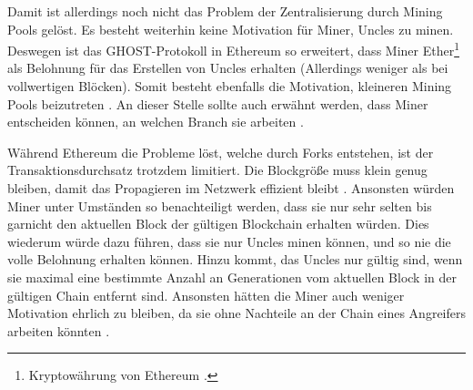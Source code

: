 Damit ist allerdings noch nicht das Problem der Zentralisierung durch Mining Pools gelöst. Es besteht weiterhin keine Motivation für Miner, Uncles zu minen. Deswegen ist das GHOST-Protokoll in Ethereum so erweitert, dass Miner Ether\footnote{Kryptowährung von Ethereum \cite{EthereumTeamEthereumWhitePaper2017}.} als Belohnung für das Erstellen von Uncles erhalten (Allerdings weniger als bei vollwertigen Blöcken). Somit besteht ebenfalls die Motivation, kleineren Mining Pools beizutreten \cite{EthereumTeamEthereumWhitePaper2017}. An dieser Stelle sollte auch erwähnt werden, dass Miner entscheiden können, an welchen Branch sie arbeiten \cite{ZhengBlockchainChallengesOpportunities2017}.

Während Ethereum die Probleme löst, welche durch Forks entstehen, ist der Transaktionsdurchsatz trotzdem limitiert. Die Blockgröße muss klein genug bleiben, damit das Propagieren im Netzwerk effizient bleibt \cite{SchererPerformanceScalabilityBlockchain2017}. Ansonsten würden Miner unter Umständen so benachteiligt werden, dass sie nur sehr selten bis garnicht den aktuellen Block der gültigen Blockchain erhalten würden. Dies wiederum würde dazu führen, dass sie nur Uncles minen können, und so nie die volle Belohnung erhalten können. Hinzu kommt, das Uncles nur gültig sind, wenn sie maximal eine bestimmte Anzahl an Generationen vom aktuellen Block in der gültigen Chain entfernt sind. Ansonsten hätten die Miner auch weniger Motivation ehrlich zu bleiben, da sie ohne Nachteile an der Chain eines Angreifers arbeiten könnten \cite{EthereumTeamEthereumWhitePaper2017}.






